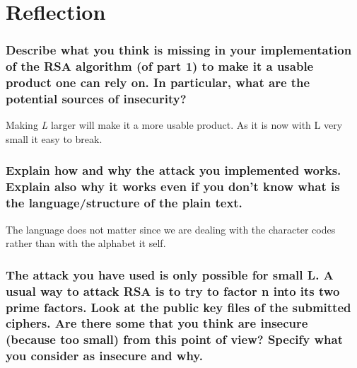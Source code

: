 \documentclass[[UTF8, a4paper, 11pt]{article}
\begin{document}
\part{Reflection}

\section{Describe what you think is missing in your implementation of the RSA algorithm (of part 1) to make it a usable product one can rely on. In particular, what are the potential sources of insecurity?}
Making \emph{L} larger will make it a more usable product. As it is now with L very small it easy to break.

\section{Explain how and why the attack you implemented works. Explain also why it works even if you don't know what is the language/structure of the plain text.}
The language does not matter since we are dealing with the character codes rather than with the alphabet it self. 

\section{The attack you have used is only possible for small L. A usual way to attack RSA is to try to factor n into its two prime factors. Look at the public key files of the submitted ciphers. Are there some that you think are insecure (because too small) from this point of view? Specify what you consider as insecure and why.}
\end{document}
